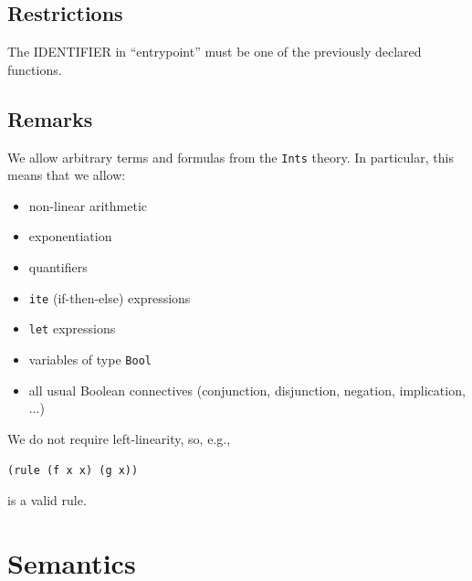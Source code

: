 \subsection{Restrictions}

The IDENTIFIER in ``entrypoint'' must be one of the previously declared functions.

\subsection{Remarks}

We allow arbitrary terms and formulas from the \texttt{Ints} theory.
%
In particular, this means that we allow:
\begin{itemize}
\item non-linear arithmetic
\item exponentiation
\item quantifiers
\item \texttt{ite} (if-then-else) expressions
\item \texttt{let} expressions
\item variables of type \texttt{Bool}
\item all usual Boolean connectives (conjunction, disjunction, negation, implication, $\ldots$)
\end{itemize}

We do not require left-linearity, so, e.g.,
\begin{center}
  \texttt{(rule (f x x) (g x))}
\end{center}
is a valid rule.

\section{Semantics}

